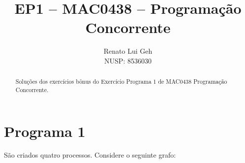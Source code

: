 \documentclass{amsart}
\title[]{EP1 -- MAC0438 -- Programação Concorrente}
\author[]{Renato Lui Geh\\NUSP\@: 8536030}
\theoremstyle{plain}
\begin{document}
\begin{abstract}
  Soluções dos exercícios bônus do Exercício Programa 1 de MAC0438 Programação Concorrente.
  \vspace*{-2.5em}
\end{abstract}

\maketitle

\section{Programa 1}

São criados quatro processos. Considere o seguinte grafo:

\begin{figure}[h]

\end{figure}
\end{document}
